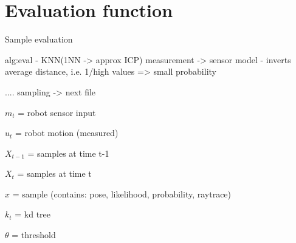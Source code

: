 \documentclass[Thesis.tex]{subfiles}
\begin{document}
\section{Evaluation function}
%
\begin{algorithm}[!htp]
\caption{Sample evaluation}
\label{alg:eval}

\end{algorithm}
%
alg:eval
- KNN(1NN -> approx ICP) measurement -> sensor model
- inverts average distance, i.e. 1/high values => small probability

.... sampling -> next file

$m_{t}$ = robot sensor input

$u_{t}$ = robot motion (measured)

$X_{t-1}$ = samples at time t-1

$X_{t}$ = samples at time t

$x$ = sample (contains: pose, likelihood, probability, raytrace)

$k_{t}$ = kd tree

$\theta$ = threshold
\end{document}
